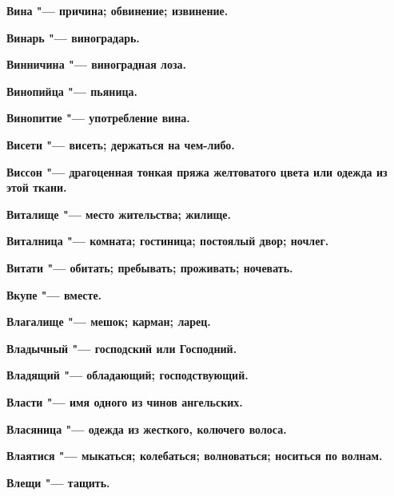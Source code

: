 \begin{multicols}{2}
\bfseries Вина\normalfont{} "--- причина; обвинение; извинение. 




\bfseries Винарь\normalfont{} "--- виноградарь. 




\bfseries Винничина\normalfont{} "--- виноградная лоза. 




\bfseries Винопийца\normalfont{} "--- пьяница. 




\bfseries Винопитие\normalfont{} "--- употребление вина. 




\bfseries Висети\normalfont{} "--- висеть; держаться на чем-либо. 




\bfseries Виссон\normalfont{} "--- драгоценная тонкая пряжа желтоватого цвета или одежда из этой ткани. 




\bfseries Виталище\normalfont{} "--- место жительства; жилище. 




\bfseries Виталница\normalfont{} "--- комната; гостиница; постоялый двор; ночлег. 




\bfseries Витати\normalfont{} "--- обитать; пребывать; проживать; ночевать. 




\bfseries Вкупе\normalfont{} "--- вместе. 




\bfseries Влагалище\normalfont{} "--- мешок; карман; ларец. 




\bfseries Владычный\normalfont{} "--- господский или Господний. 




\bfseries Владящий\normalfont{} "--- обладающий; господствующий. 




\bfseries Власти\normalfont{} "--- имя одного из чинов ангельских. 




\bfseries Власяница\normalfont{} "--- одежда из жесткого, колючего волоса. 




\bfseries Влаятися\normalfont{} "--- мыкаться; колебаться; волноваться; носиться по волнам. 




\bfseries Влещи\normalfont{} "--- тащить. 





\end{multicols}
